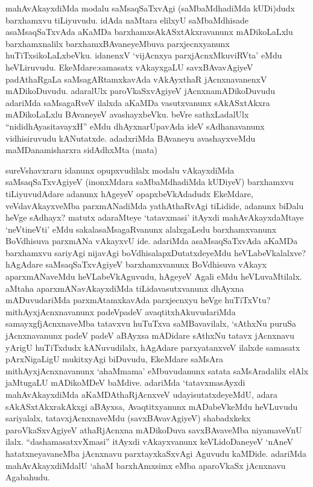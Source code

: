 
\begin{artha}
mahAvAkayxdiMda modalu saMsaqSaTxvAgi (saMbaMdhadiMda kUDi)dudx barxhamxvu tiLiyuvudu. idAda naMtara elilxyU saMbaMdhisade asaMsaqSaTxvAda aKaMDa barxhamxsAkASxtAkxravanunx mADikoLaLxlu barxhamxnalilx barxhamxBAvaneyeMbuva parxjecnxyanunx huTiTxsikoLaLxbeVku. idanenxV `vijAcnxya parxjAcnxMkuviRVta' eMdu heVLiruvudu. EkeMdare:\ndash  samasatx vAkayxgaLU savxBAvavAgiyeV padAthaRgaLa saMsagARtamxkavAda vAkAyxthaR jAcnxnavanenxV mADikoDuvudu. adaralUlx paroVkaSxvAgiyeV jAcnxnamADikoDuvudu adariMda saMsagaRveV ilalxda aKaMDa vasutxvanunx sAkASxtAkxra mADikoLaLxlu BAvaneyeV avashayxbeVku. beVre sathxLadalUlx ``nididhAyasitavayxH'' eMdu dhAyxnarUpavAda ideV sAdhanavanunx vidhisiruvudu kANutatxde. adadxriMda BAvaneyu avashayxveMdu maMDanamisharxra sidAdhxMta (mata)
\end{artha}


\begin{artha}
sureVshavxraru idanunx opupxvudilalx modalu vAkayxdiMda saMsaqSaTxvAgiyeV (inonxMdara saMbaMdhadiMda kUDiyeV) barxhamxvu tiLiyuvudAdare adanunx hAgeyeV opapxbeVkAdadudx EkeMdare, veVdavAkayxveMba parxmANadiMda yathAthaRvAgi tiLidide, adanunx biDalu heVge sAdhayx? matutx adaraMteye `tatavxmasi' itAyxdi mahAvAkayxdaMtaye `neVtineVti' eMdu sakalasaMsagaRvanunx alalxgaLedu barxhamxvanunx BoVdhisuva parxmANa vAkayxvU ide. adariMda asaMsaqSaTxvAda aKaMDa barxhamxvu sariyAgi nijavAgi boVdhisalapxDutatxdeyeMdu heVLabeVkalalxve? hAgAdare saMsaqSaTxvAgiyeV barxhamxvanunx BoVdhisuva vAkayx aparxmANaveMdu heVLabeVkAguvudu, hAgeyeV Agali eMdu heVLuvaMtilalx. aMtaha aparxmANavAkayxdiMda tiLidavasutxvanunx dhAyxna mADuvudariMda parxmAtamxkavAda parxjecnxyu heVge huTiTxVtu? mithAyxjAcnxnavanunx padeVpadeV avaqtitxhAkuvudariMda samayxgfjAcnxnaveMba tatavxvu huTuTxva saMBavavilalx, `sAthxNu puruSa jAcnxnavanunx padeV padeV aBAyxsa mADidare sAthxNu tatavx jAcnxnavu yArigU huTiTxdudx kANuvudilalx, hAgAdare parxyatanxveV ilalxde samasatx pArxNigaLigU mukitxyAgi biDuvudu, EkeMdare saMsAra mithAyxjAcnxnavanunx `ahaMmama' eMbuvudanunx satata saMsAradalilx elAlx jaMtugaLU mADikoMDeV baMdive. adariMda `tatavxmasAyxdi mahAvAkayxdiMda aKaMDAthaRjAcnxveV udayisutatxdeyeMdU, adara sAkASxtAkxrakAkxgi aBAyxsa, Avaqtitxyanunx mADabeVkeMdu heVLuvudu sariyalalx, tatavxjAcnxnaveMdu (savxBAvavAgiyeV) shabadxkekx paroVkaSxvAgiyeV athaRjAcnxna mADikoDuva savxBAvaveMba niyamaveVnU ilalx. ``dashamasatxvXmasi'' itAyxdi vAkayxvanunx keVLidoDaneyeV `nAneV hatatxneyavaneMba jAcnxnavu parxtayxkaSxvAgi Aguvudu kaMDide. adariMda mahAvAkayxdiMdalU `ahaM barxhAmxsimx eMba aparoVkaSx jAcnxnavu Agabahudu. 
\end{artha}

